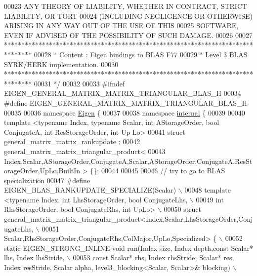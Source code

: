 \begin{DoxyCode}
00023 \textcolor{comment}{ ANY THEORY OF LIABILITY, WHETHER IN CONTRACT, STRICT LIABILITY, OR TORT}
00024 \textcolor{comment}{ (INCLUDING NEGLIGENCE OR OTHERWISE) ARISING IN ANY WAY OUT OF THE USE OF THIS}
00025 \textcolor{comment}{ SOFTWARE, EVEN IF ADVISED OF THE POSSIBILITY OF SUCH DAMAGE.}
00026 \textcolor{comment}{}
00027 \textcolor{comment}{ ********************************************************************************}
00028 \textcolor{comment}{ *   Content : Eigen bindings to BLAS F77}
00029 \textcolor{comment}{ *   Level 3 BLAS SYRK/HERK implementation.}
00030 \textcolor{comment}{ ********************************************************************************}
00031 \textcolor{comment}{*/}
00032 
00033 \textcolor{preprocessor}{#ifndef EIGEN\_GENERAL\_MATRIX\_MATRIX\_TRIANGULAR\_BLAS\_H}
00034 \textcolor{preprocessor}{#define EIGEN\_GENERAL\_MATRIX\_MATRIX\_TRIANGULAR\_BLAS\_H}
00035 
00036 \textcolor{keyword}{namespace }\hyperlink{namespace_eigen}{Eigen} \{
00037 
00038 \textcolor{keyword}{namespace }\hyperlink{namespaceinternal}{internal} \{
00039 
00040 \textcolor{keyword}{template} <\textcolor{keyword}{typename} Index, \textcolor{keyword}{typename} Scalar, \textcolor{keywordtype}{int} AStorageOrder, \textcolor{keywordtype}{bool} ConjugateA, \textcolor{keywordtype}{int} ResStorageOrder, \textcolor{keywordtype}{int}  Up
      Lo>
00041 \textcolor{keyword}{struct }general\_matrix\_matrix\_rankupdate :
00042        general\_matrix\_matrix\_triangular\_product<
00043          Index,Scalar,AStorageOrder,ConjugateA,Scalar,AStorageOrder,ConjugateA,ResStorageOrder,UpLo,BuiltIn
      > \{\};
00044 
00045 
00046 \textcolor{comment}{// try to go to BLAS specialization}
00047 \textcolor{preprocessor}{#define EIGEN\_BLAS\_RANKUPDATE\_SPECIALIZE(Scalar) \(\backslash\)}
00048 \textcolor{preprocessor}{template <typename Index, int LhsStorageOrder, bool ConjugateLhs, \(\backslash\)}
00049 \textcolor{preprocessor}{                          int RhsStorageOrder, bool ConjugateRhs, int  UpLo> \(\backslash\)}
00050 \textcolor{preprocessor}{struct general\_matrix\_matrix\_triangular\_product<Index,Scalar,LhsStorageOrder,ConjugateLhs, \(\backslash\)}
00051 \textcolor{preprocessor}{               Scalar,RhsStorageOrder,ConjugateRhs,ColMajor,UpLo,Specialized> \{ \(\backslash\)}
00052 \textcolor{preprocessor}{  static EIGEN\_STRONG\_INLINE void run(Index size, Index depth,const Scalar* lhs, Index lhsStride, \(\backslash\)}
00053 \textcolor{preprocessor}{                          const Scalar* rhs, Index rhsStride, Scalar* res, Index resStride, Scalar alpha,
       level3\_blocking<Scalar, Scalar>& blocking) \(\backslash\)}

\end{DoxyCode}
